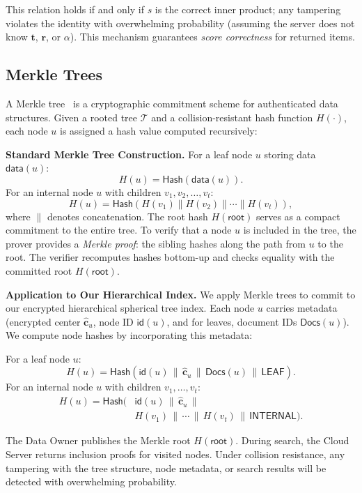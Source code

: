 \documentclass[journal]{IEEEtran}
\begin{document}
This relation holds if and only if $s$ is the correct inner product; any tampering violates the identity with overwhelming probability (assuming the server does not know $\mathbf{t}$, $\mathbf{r}$, or $\alpha$). This mechanism guarantees \emph{score correctness} for returned items.

\subsection{Merkle Trees}

A Merkle tree~\cite{merkle1987digital} is a cryptographic commitment scheme for authenticated data structures. Given a rooted tree $\mathcal{T}$ and a collision-resistant hash function $H(\cdot)$, each node $u$ is assigned a hash value computed recursively:

\textbf{Standard Merkle Tree Construction.} For a leaf node $u$ storing data $\mathsf{data}(u)$:
\[
 H(u) = \mathsf{Hash}(\mathsf{data}(u)).
\]
For an internal node $u$ with children $v_1, v_2, \ldots, v_t$:
\[
 H(u) = \mathsf{Hash}(H(v_1) \| H(v_2) \| \cdots \| H(v_t)),
\]
where $\|$ denotes concatenation. The root hash $H(\textsf{root})$ serves as a compact commitment to the entire tree. To verify that a node $u$ is included in the tree, the prover provides a \emph{Merkle proof}: the sibling hashes along the path from $u$ to the root. The verifier recomputes hashes bottom-up and checks equality with the committed root $H(\textsf{root})$.

\textbf{Application to Our Hierarchical Index.} We apply Merkle trees to commit to our encrypted hierarchical spherical tree index. Each node $u$ carries metadata (encrypted center $\widehat{\mathbf{c}}_u$, node ID $\textsf{id}(u)$, and for leaves, document IDs $\mathsf{Docs}(u)$). We compute node hashes by incorporating this metadata:

For a leaf node $u$:
\[
 H(u)=\mathsf{Hash}(\textsf{id}(u)\,\|\,\widehat{\mathbf{c}}_u\,\|\,\mathsf{Docs}(u)\,\|\,\textsf{LEAF}).
\]
For an internal node $u$ with children $v_1,\ldots,v_t$:
\[
\begin{aligned}
 H(u) = \mathsf{Hash}(&\textsf{id}(u)\,\|\,\widehat{\mathbf{c}}_u\,\|\,\\
 &H(v_1)\,\|\,\cdots\,\|\,H(v_t)\,\|\,\textsf{INTERNAL}).
\end{aligned}
\]

The Data Owner publishes the Merkle root $H(\textsf{root})$. During search, the Cloud Server returns inclusion proofs for visited nodes. Under collision resistance, any tampering with the tree structure, node metadata, or search results will be detected with overwhelming probability.
\end{document}
